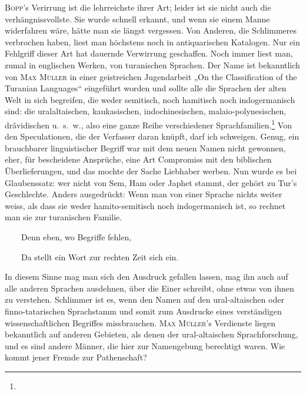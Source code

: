 \textsc{Bopp}’s Verirrung ist die lehrreichste ihrer Art; leider ist sie nicht auch die verhängnissvollste. Sie wurde schnell erkannt, und wenn sie einem  Manne widerfahren wäre, hätte man sie längst vergessen. Von Anderen, die Schlimmeres verbrochen haben, liest man höchstens noch in antiquarischen Katalogen. Nur ein Fehlgriff dieser Art hat dauernde Verwirrung geschaffen. Noch immer liest man, zumal in englischen Werken, von turanischen Sprachen. Der Name ist bekanntlich von \textsc{Max Müller} in einer geistreichen Jugendarbeit „On the Classification of the Turanian Languages“ eingeführt worden und sollte alle die Sprachen der alten Welt in sich begreifen, die weder semitisch, noch hamitisch noch indogermanisch sind: die uralaltaischen, kaukasischen, indochinesischen, malaio-polynesischen, drâvidischen u.~s.~w., also eine ganze Reihe verschiedener Sprachfamilien.\footnote{} Von den Speculationen, die der Verfasser daran knüpft, darf ich schweigen. Genug, ein brauchbarer linguistischer Begriff war mit dem neuen Namen nicht gewonnen, eher, für bescheidene Ansprüche, eine Art Compromiss mit den biblischen Überlieferungen, und das mochte der Sache Liebhaber werben. Nun wurde es bei  Glaubenssatz: wer nicht von Sem, Ham oder Japhet stammt, der gehört zu Tur’s Geschlechte. Anders ausgedrückt: Wenn man von einer Sprache nichts weiter weiss, als dass sie weder hamito-semitisch noch indogermanisch ist, so rechnet man sie zur turanischen Familie.

\label{fp.166}

~~~~Denn eben, wo Begriffe fehlen,

~~~~Da stellt ein Wort zur rechten Zeit sich ein.

\noindent In diesem Sinne mag man sich den Ausdruck gefallen lassen, mag ihn auch auf alle anderen Sprachen ausdehnen, über die Einer schreibt, ohne etwas von ihnen zu verstehen. Schlimmer ist es, wenn  den Namen auf den ural-altaischen oder finno-tatarischen Sprachstamm  und somit zum Ausdrucke eines verständigen wissenschaftlichen Begriffes missbrauchen. \textsc{Max Müller}’s Verdienste liegen bekanntlich auf anderen Gebieten, als denen der ural-altaischen \label{sp.156} Sprachforschung, und es sind andere Männer, die hier zur Namengebung berechtigt waren. Wie kommt jener Fremde zur Pathenschaft?

